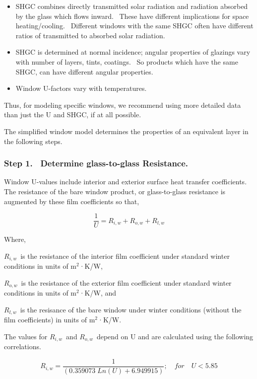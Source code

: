 \begin{itemize}
\item
  SHGC combines directly transmitted solar radiation and radiation absorbed by the glass which flows inward.~ These have different implications for space heating/cooling.~ Different windows with the same SHGC often have different ratios of transmitted to absorbed solar radiation.
\item
  SHGC is determined at normal incidence; angular properties of glazings vary with number of layers, tints, coatings.~ So products which have the same SHGC, can have different angular properties.
\item
  Window U-factors vary with temperatures.
\end{itemize}

Thus, for modeling specific windows, we recommend using more detailed data than just the U and SHGC, if at all possible.

The simplified window model determines the properties of an equivalent layer in the following steps.

\subsubsection{Step 1.~ Determine glass-to-glass Resistance.}\label{step-1.-determine-glass-to-glass-resistance.}

Window U-values include interior and exterior surface heat transfer coefficients.~ The resistance of the bare window product, or glass-to-glass resistance is augmented by these film coefficients so that,

\begin{equation}
\frac{1}{U} = {R_{i,w}} + {R_{o,w}} + {R_{l,w}}
\end{equation}

Where,

\({R_{i,w}}\)~is the resistance of the interior film coefficient under standard winter conditions in units of m\(^{2}\)·K/W,

\({R_{o,w}}\)~is the resistance of the exterior film coefficient under standard winter conditions in units of m\(^{2}\)·K/W, and

\({R_{l,w}}\)~is the resisance of the bare window under winter conditions (without the film coefficients) in units of m\(^{2}\)·K/W.

The values for \({R_{i,w}}\)~and \({R_{o,w}}\)~depend on U and are calculated using the following correlations.

\begin{equation}
{R_{i,w}} = \frac{1}{{(0.359073\;Ln(U) + 6.949915)}};\quad for\quad U < 5.85
\end{equation}


